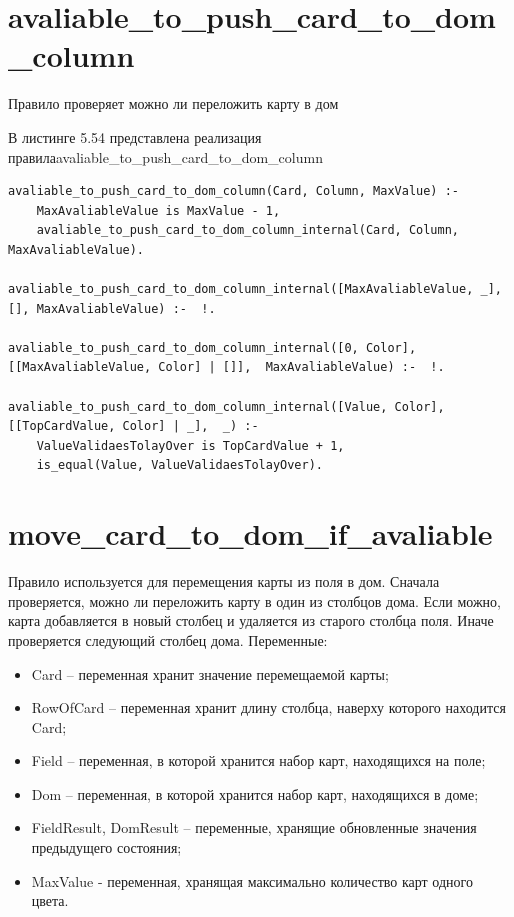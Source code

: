 \documentclass[12pt]{report}
\begin{document}
\section{avaliable\_to\_push\_card\_to\_dom\_column}
Правило проверяет можно ли переложить карту в дом

В листинге 5.54 представлена реализация правила\newline avaliable\_to\_push\_card\_to\_dom\_column

\begin{lstlisting}[label=some-code, caption=реализация правила avaliable\_to\_push\_card\_to\_dom\_column]
avaliable_to_push_card_to_dom_column(Card, Column, MaxValue) :-
	MaxAvaliableValue is MaxValue - 1,
	avaliable_to_push_card_to_dom_column_internal(Card, Column, MaxAvaliableValue).

avaliable_to_push_card_to_dom_column_internal([MaxAvaliableValue, _], [], MaxAvaliableValue) :-  !.

avaliable_to_push_card_to_dom_column_internal([0, Color], [[MaxAvaliableValue, Color] | []],  MaxAvaliableValue) :-  !.

avaliable_to_push_card_to_dom_column_internal([Value, Color], [[TopCardValue, Color] | _],  _) :-
	ValueValidaesTolayOver is TopCardValue + 1,
	is_equal(Value, ValueValidaesTolayOver).
\end{lstlisting}

\section{move\_card\_to\_dom\_if\_avaliable}
Правило используется для перемещения карты из поля в дом. Сначала проверяется, можно ли переложить карту в один из столбцов дома. Если можно, карта добавляется в новый столбец и удаляется из старого столбца поля. Иначе проверяется следующий столбец дома.
Переменные:
\begin{itemize}
\item Card – переменная хранит значение перемещаемой карты;
\item RowOfCard – переменная хранит длину столбца, наверху которого находится Card;
\item Field – переменная, в которой хранится набор карт, находящихся на поле;
\item Dom – переменная, в которой хранится набор карт, находящихся в доме;
\item FieldResult, DomResult – переменные, хранящие обновленные значения предыдущего состояния;
\item MaxValue - переменная, хранящая максимально количество карт одного цвета.
\end{itemize}
\end{document}
